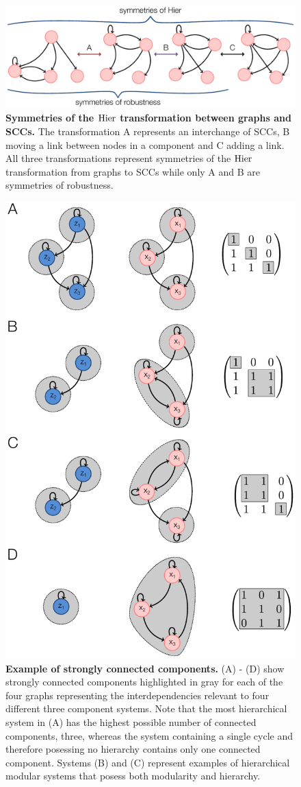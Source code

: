 \pagebreak

\begin{figure}[!ht]
\centering
\noindent\includegraphics[width=0.7\columnwidth]{fig/hiertransformations.pdf}
\caption{{\bf Symmetries of the $\mathrm{Hier}$ transformation between graphs and SCCs.} The transformation A represents an interchange of SCCs, B moving a link between nodes in a component and C adding a link. All three transformations represent symmetries of the $\mathrm{Hier}$ transformation from graphs to SCCs while only A and B are symmetries of robustness.}
\label{fig:hiertransformations}
\end{figure}

\pagebreak

\begin{figure}[!ht]
\centering
\noindent\includegraphics[width=0.4\columnwidth]{fig/scc2.pdf}
\caption{{\bf Example of strongly connected components.} (A) - (D) show strongly connected components highlighted in gray for each of the four graphs representing the interdependencies relevant to four different three component systems. Note that the most hierarchical system in (A) has the highest possible number of connected components, three, whereas the system containing a single cycle and therefore posessing no hierarchy contains only one connected component. Systems (B) and (C) represent examples of hierarchical modular systems that posess both modularity and hierarchy.}
\label{fig:scc}
\end{figure}

